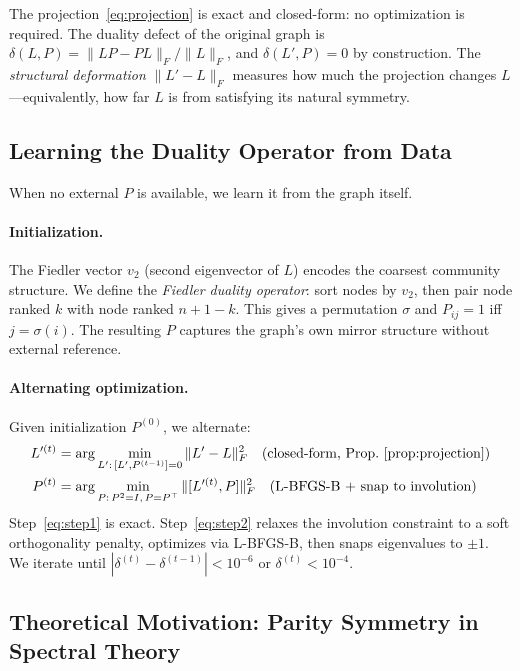 \documentclass[11pt]{article}
\newcommand{\LP}{L'}
\newcommand{\Fro}[1]{\|#1\|_F}
\begin{document}
The projection~\eqref{eq:projection} is exact and closed-form: no
optimization is required.
The duality defect of the original graph is
$\delta(L, P) = \Fro{LP - PL} / \Fro{L}$,
and $\delta(\LP, P) = 0$ by construction.
The \emph{structural deformation} $\Fro{\LP - L}$ measures how much the
projection changes $L$---equivalently, how far $L$ is from satisfying
its natural symmetry.

\subsection{Learning the Duality Operator from Data}

When no external $P$ is available, we learn it from the graph itself.

\paragraph{Initialization.}
The Fiedler vector $v_2$ (second eigenvector of $L$) encodes the
coarsest community structure.
We define the \emph{Fiedler duality operator}: sort nodes by $v_2$,
then pair node ranked $k$ with node ranked $n+1-k$.
This gives a permutation $\sigma$ and $P_{ij} = 1$ iff $j = \sigma(i)$.
The resulting $P$ captures the graph's own mirror structure without
external reference.

\paragraph{Alternating optimization.}
Given initialization $P^{(0)}$, we alternate:
\begin{align}
  \LP^{(t)} &= \arg\min_{\LP:\,[\LP,P^{(t-1)}]=0} \Fro{\LP - L}^2
              \quad \text{(closed-form, Prop.~\ref{prop:projection})}
              \label{eq:step1} \\
  P^{(t)}   &= \arg\min_{P:\,P^2=I,\,P=P^\top} \Fro{[\LP^{(t)}, P]}^2
              \quad \text{(L-BFGS-B + snap to involution)}
              \label{eq:step2}
\end{align}
Step~\eqref{eq:step1} is exact.
Step~\eqref{eq:step2} relaxes the involution constraint to a soft
orthogonality penalty, optimizes via L-BFGS-B, then snaps eigenvalues
to $\pm 1$.
We iterate until $|\delta^{(t)} - \delta^{(t-1)}| < 10^{-6}$ or
$\delta^{(t)} < 10^{-4}$.

\subsection{Theoretical Motivation: Parity Symmetry in Spectral Theory}
\end{document}
